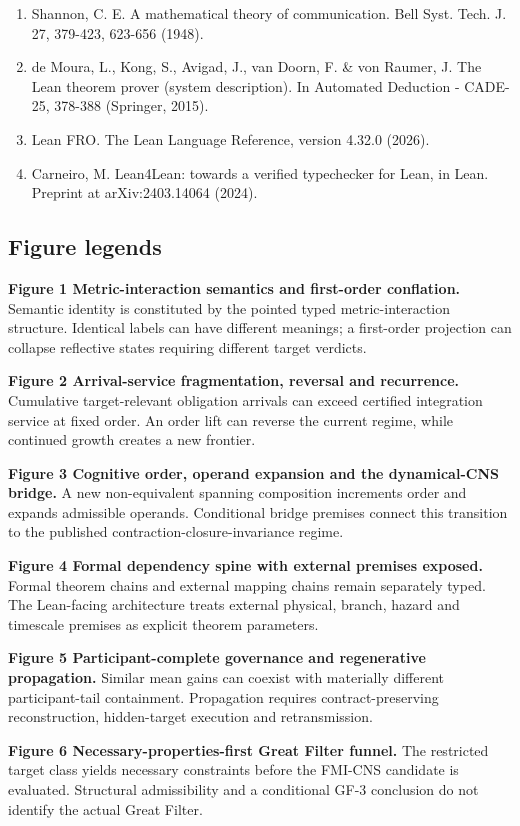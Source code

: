 \begin{enumerate}
  103, 207-210 (1981).\\
\item
  Shannon, C. E. A mathematical theory of communication. Bell Syst.
  Tech. J. 27, 379-423, 623-656 (1948).\\
\item
  de Moura, L., Kong, S., Avigad, J., van Doorn, F. \& von Raumer, J.
  The Lean theorem prover (system description). In Automated Deduction -
  CADE-25, 378-388 (Springer, 2015).\\
\item
  Lean FRO. The Lean Language Reference, version 4.32.0 (2026).\\
\item
  Carneiro, M. Lean4Lean: towards a verified typechecker for Lean, in
  Lean. Preprint at arXiv:2403.14064 (2024).
\end{enumerate}

\hypertarget{figure-legends}{%
\subsection{Figure legends}\label{figure-legends}}

\textbf{Figure 1 \textbar{} Metric-interaction semantics and first-order
conflation.} Semantic identity is constituted by the pointed typed
metric-interaction structure. Identical labels can have different
meanings; a first-order projection can collapse reflective states
requiring different target verdicts.

\textbf{Figure 2 \textbar{} Arrival-service fragmentation, reversal and
recurrence.} Cumulative target-relevant obligation arrivals can exceed
certified integration service at fixed order. An order lift can reverse
the current regime, while continued growth creates a new frontier.

\textbf{Figure 3 \textbar{} Cognitive order, operand expansion and the
dynamical-CNS bridge.} A new non-equivalent spanning composition
increments order and expands admissible operands. Conditional bridge
premises connect this transition to the published
contraction-closure-invariance regime.

\textbf{Figure 4 \textbar{} Formal dependency spine with external
premises exposed.} Formal theorem chains and external mapping chains
remain separately typed. The Lean-facing architecture treats external
physical, branch, hazard and timescale premises as explicit theorem
parameters.

\textbf{Figure 5 \textbar{} Participant-complete governance and
regenerative propagation.} Similar mean gains can coexist with
materially different participant-tail containment. Propagation requires
contract-preserving reconstruction, hidden-target execution and
retransmission.

\textbf{Figure 6 \textbar{} Necessary-properties-first Great Filter
funnel.} The restricted target class yields necessary constraints before
the FMI-CNS candidate is evaluated. Structural admissibility and a
conditional GF-3 conclusion do not identify the actual Great Filter.
